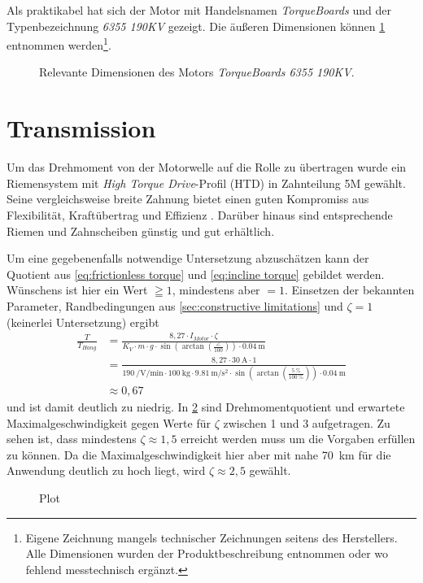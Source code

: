 	Als praktikabel hat sich der Motor mit Handelsnamen \textit{TorqueBoards} und der Typenbezeichnung \textit{6355 190KV} gezeigt.
	Die äußeren Dimensionen können \cref{fig:motor} entnommen werden\footnote{Eigene Zeichnung mangels technischer Zeichnungen seitens des Herstellers.
	Alle Dimensionen wurden der Produktbeschreibung entnommen oder wo fehlend messtechnisch ergänzt.}.
	\begin{figure}[h]
		\centering
		
		\caption{Relevante Dimensionen des Motors \textit{TorqueBoards 6355 190KV}.}
		\label{fig:motor}
	\end{figure}
	\section{Transmission}\label{sec:transmission}
		Um das Drehmoment von der Motorwelle auf die Rolle zu übertragen wurde ein Riemensystem mit \textit{High Torque Drive}-Profil (HTD) in Zahnteilung 5M gewählt. 
		Seine vergleichsweise breite Zahnung bietet einen guten Kompromiss aus Flexibilität, Kraftübertrag und Effizienz \cite{gates.catalogue.2021}.
		Darüber hinaus sind entsprechende Riemen und Zahnscheiben günstig und gut erhältlich.\par\medskip
		Um eine gegebenenfalls notwendige Untersetzung abzuschätzen kann der Quotient aus \cref{eq:frictionless torque} und \cref{eq:incline torque} gebildet werden.
		Wünschens ist hier ein Wert \(\geqq 1\), mindestens aber \(= 1\).
		Einsetzen der bekannten Parameter, Randbedingungen aus \cref{sec:constructive limitations} und \(\zeta = 1\) (keinerlei Untersetzung) ergibt
		\begin{align}
			\frac{T}{T_{Hang}}	&= \frac{8,27 \cdot I_{Motor} \cdot \zeta}{K_V \cdot m \cdot g \cdot \sin\left(\arctan\left(\frac{\angle}{100}\right)\right) \cdot \qty{0,04}{\metre}} \nonumber \\
								&= \frac{8,27 \cdot \qty{30}{\ampere} \cdot 1}{\qty{190}{\per\volt\per\minute} \cdot \qty{100}{\kilo\gram} \cdot \qty{9,81}{\meter\per\second\squared} \cdot \sin\left(\arctan\left(\frac{\qty{5}{\percent}}{\qty{100}{\percent}}\right)\right) \cdot \qty{0,04}{\metre}} \nonumber \\
								&\approx 0,67
			\label{eq:transmissionless torque ratio}
		\end{align}
		und ist damit deutlich zu niedrig.
		In \cref{fig:torque ratio and vmax vs zetas} sind Drehmomentquotient und erwartete Maximalgeschwindigkeit gegen Werte für \(\zeta\) zwischen 1 und 3 aufgetragen.
		Zu sehen ist, dass mindestens \(\zeta \approx 1,5\) erreicht werden muss um die Vorgaben erfüllen zu können.
		Da die Maximalgeschwindigkeit hier aber mit nahe \qty{70}{\kilo\metre} für die Anwendung deutlich zu hoch liegt, wird \(\zeta \approx 2,5\) gewählt.
		\begin{figure}[h]
			\centering
			
			\caption{Plot}
			\label{fig:torque ratio and vmax vs zetas}
		\end{figure}
		
